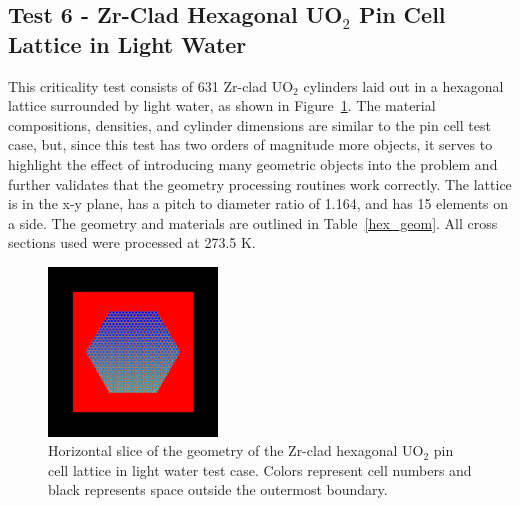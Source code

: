 \documentclass[preprint,12pt]{elsarticle}
\begin{document}
\newpage
\subsection{Test 6 - Zr-Clad Hexagonal UO$_2$ Pin Cell Lattice in Light Water}

This criticality test consists of 631 Zr-clad UO$_2$ cylinders laid out in a hexagonal lattice surrounded by light water, as shown in Figure~\ref{hex_geom_pic}.  The material compositions, densities, and cylinder dimensions are similar to the pin cell test case, but, since this test has two orders of magnitude more objects, it serves to highlight the effect of introducing many geometric objects into the problem and further validates that the geometry processing routines work correctly.  The lattice is in the x-y plane, has a pitch to diameter ratio of 1.164, and has 15 elements on a side.  The geometry and materials are outlined in Table~\ref{hex_geom}.  All cross sections used were processed at 273.5 K.

\begin{figure}[!htbp] 
  \centering
    \includegraphics[width=0.4\textwidth]{graphics/assembly-lw-xy.png}
     \caption{ Horizontal slice of the geometry of the Zr-clad hexagonal UO$_2$ pin cell lattice in light water test case.  Colors represent cell numbers and black represents space outside the outermost boundary. \label{hex_geom_pic} }
\end{figure}
\end{document}
